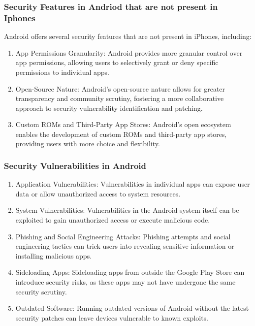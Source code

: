 \documentclass[11pt]{article}
\begin{document}
\subsubsection{Security Features in Andriod that are not present in Iphones}

Android offers several security features that are not present in iPhones,
including:

\begin{enumerate}
      \item App Permissions Granularity: Android provides more granular control over app
            permissions, allowing users to selectively grant or deny specific permissions
            to individual apps.

      \item Open-Source Nature: Android's open-source nature allows for greater
            transparency and community scrutiny, fostering a more collaborative approach to
            security vulnerability identification and patching.

      \item Custom ROMs and Third-Party App Stores: Android's open ecosystem enables the
            development of custom ROMs and third-party app stores, providing users with
            more choice and flexibility.
\end{enumerate}

\subsubsection{Security Vulnerabilities in Android}

\begin{enumerate}
      \item Application Vulnerabilities: Vulnerabilities in individual apps can expose user
            data or allow unauthorized access to system resources.

      \item System Vulnerabilities: Vulnerabilities in the Android system itself can be
            exploited to gain unauthorized access or execute malicious code.

      \item Phishing and Social Engineering Attacks: Phishing attempts and social
            engineering tactics can trick users into revealing sensitive information or
            installing malicious apps.

      \item Sideloading Apps: Sideloading apps from outside the Google Play Store can
            introduce security risks, as these apps may not have undergone the same
            security scrutiny.

      \item Outdated Software: Running outdated versions of Android without the latest
            security patches can leave devices vulnerable to known exploits.

\end{enumerate}
\end{document}
